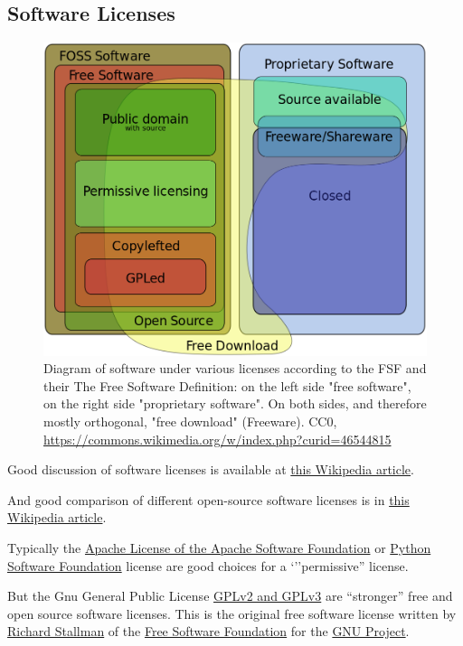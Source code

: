 \documentclass[11pt]{article} %
\begin{document}
  \subsection{Software Licenses}
  
    \begin{figure}[h]
      \centering
      \includegraphics[width=0.5\linewidth]{figs/Software_Categories_expanded}
      \caption{Diagram of software under various licenses according to the FSF and their The Free Software Definition: on the left side "free software", on the right side "proprietary software". On both sides, and therefore mostly orthogonal, "free download" (Freeware). CC0, \href{https://commons.wikimedia.org/w/index.php?curid=46544815}{https://commons.wikimedia.org/w/index.php?curid=46544815}}
      \label{fig:software-licenses}
    \end{figure}
    
    Good discussion of software licenses is available at \href{https://en.wikipedia.org/wiki/Software_license}{this Wikipedia article}.
    
    And good comparison of different open-source software licenses is in \href{https://en.wikipedia.org/wiki/Comparison_of_free_and_open-source_software_licenses}{this Wikipedia article}.
    
    Typically the \href{https://en.wikipedia.org/wiki/Apache_License}{Apache License of the Apache Software Foundation} or \href{https://en.wikipedia.org/wiki/Python_Software_Foundation_License}{Python Software Foundation} license are good choices for a `''permissive'' license.  
    
    But the Gnu General Public License \href{https://en.wikipedia.org/wiki/GNU_General_Public_License}{GPLv2 and GPLv3}  are ``stronger'' free and open source software licenses. This is the original free software license written by \href{https://en.wikipedia.org/wiki/Richard_Stallman}{Richard Stallman}  of the \href{https://en.wikipedia.org/wiki/Free_Software_Foundation}{Free Software Foundation} for the \href{https://en.wikipedia.org/wiki/GNU_Project}{GNU Project}.
    
\end{document}
